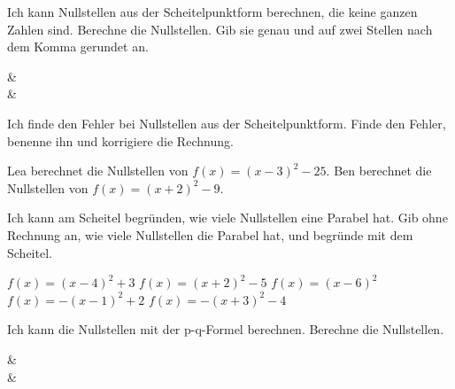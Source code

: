\begin{aufgabe}{Ich kann Nullstellen aus der Scheitelpunktform berechnen, die keine ganzen Zahlen sind.}
Berechne die Nullstellen. Gib sie genau und auf zwei Stellen nach dem Komma gerundet an.
\begin{gleichungsraster}[4]
 &  \\
 & \\
\end{gleichungsraster}
\end{aufgabe}

\begin{aufgabe}{Ich finde den Fehler bei Nullstellen aus der Scheitelpunktform.}
Finde den Fehler, benenne ihn und korrigiere die Rechnung.
\begin{teile}
\teil Lea berechnet die Nullstellen von $f(x) = (x-3)^2 - 25$.
\teil Ben berechnet die Nullstellen von $f(x) = (x+2)^2 - 9$.
\end{teile}
\end{aufgabe}

\begin{aufgabe}{Ich kann am Scheitel begründen, wie viele Nullstellen eine Parabel hat.}
Gib ohne Rechnung an, wie viele Nullstellen die Parabel hat, und begründe mit dem Scheitel.
\begin{teile}
\teil $f(x) = (x-4)^2 + 3$
\teil $f(x) = (x+2)^2 - 5$
\teil $f(x) = (x-6)^2$
\teil $f(x) = -(x-1)^2 + 2$
\teil $f(x) = -(x+3)^2 - 4$
\end{teile}
\end{aufgabe}


\begin{aufgabe}{Ich kann die Nullstellen mit der p-q-Formel berechnen.}
Berechne die Nullstellen.
\begin{gleichungsraster}[4]
 &  \\
 &  \\
\end{gleichungsraster}
\end{aufgabe}

